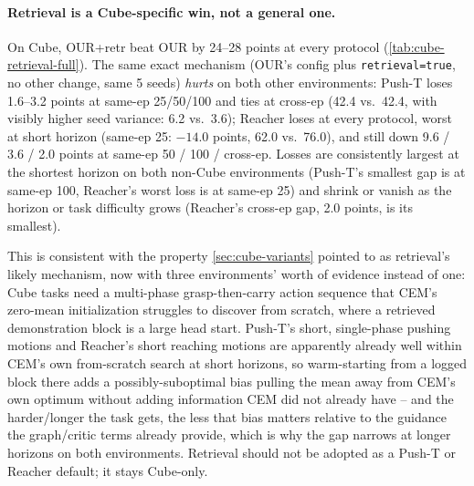 \documentclass[11pt]{article}
\begin{document}
\paragraph{Retrieval is a Cube-specific win, not a general one.} On Cube, OUR+retr beat OUR by
24--28 points at every protocol (\cref{tab:cube-retrieval-full}). The same exact mechanism
(OUR's config plus \texttt{retrieval=true}, no other change, same 5 seeds) \emph{hurts} on
both other environments: Push-T loses 1.6--3.2 points at same-ep 25/50/100 and ties at
cross-ep (42.4 vs.\ 42.4, with visibly higher seed variance: 6.2 vs.\ 3.6); Reacher loses at
every protocol, worst at short horizon (same-ep 25: $-14.0$ points, 62.0 vs.\ 76.0), and still
down 9.6 / 3.6 / 2.0 points at same-ep 50 / 100 / cross-ep. Losses are consistently largest at
the shortest horizon on both non-Cube environments (Push-T's smallest gap is at same-ep 100,
Reacher's worst loss is at same-ep 25) and shrink or vanish as the horizon or task difficulty
grows (Reacher's cross-ep gap, 2.0 points, is its smallest).

This is consistent with the property \cref{sec:cube-variants} pointed to as retrieval's likely
mechanism, now with three environments' worth of evidence instead of one: Cube tasks need a
multi-phase grasp-then-carry action sequence that CEM's zero-mean initialization struggles to
discover from scratch, where a retrieved demonstration block is a large head start. Push-T's
short, single-phase pushing motions and Reacher's short reaching motions are apparently
already well within CEM's own from-scratch search at short horizons, so warm-starting from a
logged block there adds a possibly-suboptimal bias pulling the mean away from CEM's own
optimum without adding information CEM did not already have -- and the harder/longer the task
gets, the less that bias matters relative to the guidance the graph/critic terms already
provide, which is why the gap narrows at longer horizons on both environments. Retrieval
should not be adopted as a Push-T or Reacher default; it stays Cube-only.
\end{document}
